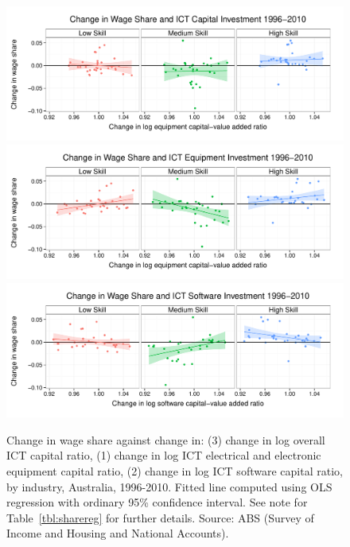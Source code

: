 \begin{figure}
  \centering
  \includegraphics[width=\textwidth]{../figure/wage_share_ict.pdf}
  \includegraphics[width=\textwidth]{../figure/wage_share_equipment_skill.pdf}
  \includegraphics[width=\textwidth]{../figure/wage_share_software_skill.pdf}
  \caption{Change in wage share against change in: (3) change in log overall ICT capital ratio, (1) change in log ICT electrical and electronic equipment capital ratio, (2) change in log ICT software capital ratio, by industry, Australia, 1996-2010.
    Fitted line computed using OLS regression with ordinary 95\% confidence interval. See note for Table~\ref{tbl:sharereg} for further details. Source: ABS (Survey of Income and Housing and National Accounts).
  }
  \label{fig:equip}
\end{figure}

